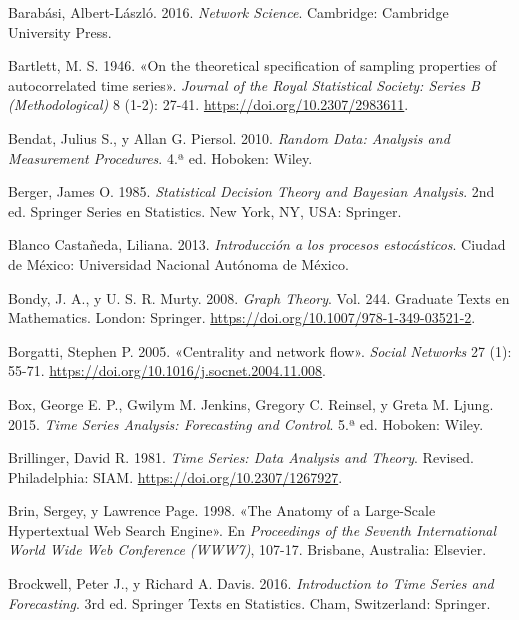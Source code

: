 \documentclass[
  spanish,
  us-letterpaper,
]{scrreprt}
\newlength{\cslhangindent}
\newenvironment{CSLReferences}[2] %
 {\begin{list}{}{%
  \setlength{\itemindent}{0pt}
  \setlength{\leftmargin}{0pt}
  \setlength{\parsep}{0pt}
  \ifodd #1
   \setlength{\leftmargin}{\cslhangindent}
   \setlength{\itemindent}{-1\cslhangindent}
  \fi
  \setlength{\itemsep}{#2\baselineskip}}}
 {\end{list}}
\numberwithin{equation}{section}
\begin{document}
\label{refs}
\begin{CSLReferences}{1}{0}
Barabási, Albert-László. 2016. \emph{Network Science}. Cambridge:
Cambridge University Press.

Bartlett, M. S. 1946. {«On the theoretical specification of sampling
properties of autocorrelated time series»}. \emph{Journal of the Royal
Statistical Society: Series B (Methodological)} 8 (1-2): 27-41.
\url{https://doi.org/10.2307/2983611}.

Bendat, Julius S., y Allan G. Piersol. 2010. \emph{Random Data: Analysis
and Measurement Procedures}. 4.ª ed. Hoboken: Wiley.

Berger, James O. 1985. \emph{Statistical Decision Theory and Bayesian
Analysis}. 2nd ed. Springer Series en Statistics. New York, NY, USA:
Springer.

Blanco Castañeda, Liliana. 2013. \emph{Introducción a los procesos
estocásticos}. Ciudad de México: Universidad Nacional Autónoma de
México.

Bondy, J. A., y U. S. R. Murty. 2008. \emph{Graph Theory}. Vol. 244.
Graduate Texts en Mathematics. London: Springer.
\url{https://doi.org/10.1007/978-1-349-03521-2}.

Borgatti, Stephen P. 2005. {«Centrality and network flow»}. \emph{Social
Networks} 27 (1): 55-71.
\url{https://doi.org/10.1016/j.socnet.2004.11.008}.

Box, George E. P., Gwilym M. Jenkins, Gregory C. Reinsel, y Greta M.
Ljung. 2015. \emph{Time Series Analysis: Forecasting and Control}. 5.ª
ed. Hoboken: Wiley.

Brillinger, David R. 1981. \emph{Time Series: Data Analysis and Theory}.
Revised. Philadelphia: SIAM. \url{https://doi.org/10.2307/1267927}.

Brin, Sergey, y Lawrence Page. 1998. {«The Anatomy of a Large-Scale
Hypertextual Web Search Engine»}. En \emph{Proceedings of the Seventh
International World Wide Web Conference (WWW7)}, 107-17. Brisbane,
Australia: Elsevier.

Brockwell, Peter J., y Richard A. Davis. 2016. \emph{Introduction to
Time Series and Forecasting}. 3rd ed. Springer Texts en Statistics.
Cham, Switzerland: Springer.


\end{CSLReferences}
\end{document}
